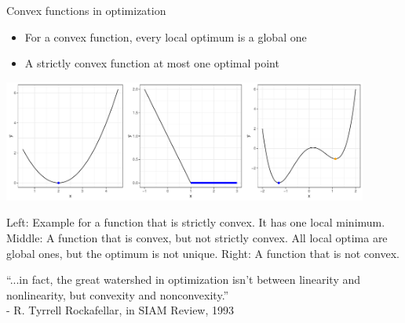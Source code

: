 \begin{vbframe}{Convex functions in optimization}
  

  \begin{itemize}
    \item For a convex function, every local optimum is a global one  
    \item A strictly convex function at most one optimal point
  \end{itemize}
  
  \begin{center}
  \includegraphics[width = 0.9\textwidth]{figure_man/convexity_3.pdf} \\
  \begin{footnotesize}
  Left: Example for a function that is strictly convex. It has one local minimum. Middle: A function that is convex, but not strictly convex. All local optima are global ones, but the optimum is not unique. Right: A function that is not convex. 
  \end{footnotesize} 
  \end{center}
  
\framebreak 

\vspace*{2cm}

\begin{center}
\Large{\enquote{...in fact, the great watershed in optimization isn't between linearity and nonlinearity, but convexity and nonconvexity.}}\\
\normalsize - R. Tyrrell Rockafellar, in SIAM Review, 1993
\end{center}

	
\end{vbframe}

\endlecture
